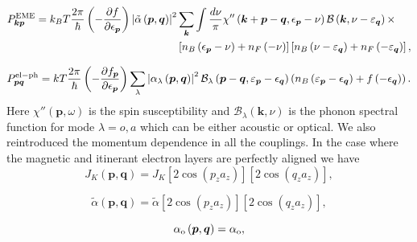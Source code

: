 \documentclass[aps,prl,twocolumn,superscriptaddress,amsmath,nofootinbib,10pt,floatfix]{revtex4-2}
\begin{document}
\begin{widetext}
\begin{align}
P_{\boldsymbol{k}\boldsymbol{p}}^{\rm{EME}} =k_BT\frac{2\pi}{\hbar}\left(-\frac{\partial f}{\partial\epsilon_{\boldsymbol{p}}}\right)\left|\tilde{\alpha}\left(\boldsymbol{p},\boldsymbol{q}\right)\right|^{2} & \sum_{\boldsymbol{k}}\int\frac{d\nu}{\pi}\chi''\left(\boldsymbol{k}+\boldsymbol{p}-\boldsymbol{q},\epsilon_{\boldsymbol{p}}-\nu\right)\mathcal{B}\left(\boldsymbol{k},\nu-\varepsilon_{\boldsymbol{q}}\right) \times \nonumber \\ &\left[n_{B}\left(\epsilon_{\boldsymbol{p}}-\nu\right)+n_{F}\left(-\nu\right)\right]\left[n_{B}\left(\nu-\varepsilon_{\boldsymbol{q}}\right)+n_{F}\left(-\varepsilon_{\boldsymbol{q}}\right)\right],
\end{align}

\begin{equation}
P_{\boldsymbol{p}\boldsymbol{q}}^{\rm{el-ph}}=kT\frac{2\pi}{\hbar}\left(-\frac{\partial f_{\boldsymbol{p}}}{\partial\epsilon_{\boldsymbol{p}}}\right)\sum_{\lambda}\left|\alpha_{\lambda}\left(\boldsymbol{p},\boldsymbol{q}\right)\right|^{2}\mathcal{B}_{\lambda}\left(\boldsymbol{p}-\boldsymbol{q},\varepsilon_{\boldsymbol{p}}-\epsilon_{\boldsymbol{q}}\right)\left(n_{B}\left(\varepsilon_{\boldsymbol{p}}-\epsilon_{\boldsymbol{q}}\right)+f\left(-\epsilon_{\boldsymbol{q}}\right)\right).
\end{equation}
Here $\chi''\left(\boldsymbol{p},\omega\right)$ is the spin susceptibility
and $\mathcal{B}_{\lambda}\left(\boldsymbol{k},\nu\right)$ is the
phonon spectral function for mode $\lambda=o,a$ which can be either
acoustic or optical. We also reintroduced the momentum dependence
in all the couplings. In the case where the magnetic and itinerant
electron layers are perfectly aligned we have 
\begin{equation}
J_{K}\left(\boldsymbol{p},\boldsymbol{q}\right)=J_{K}\left[2\cos\left(p_{z}a_{z}\right)\right]\left[2\cos\left(q_{z}a_{z}\right)\right],
\end{equation}

\begin{equation}
\tilde{\alpha}\left(\boldsymbol{p},\boldsymbol{q}\right)=\tilde{\alpha}\left[2\cos\left(p_{z}a_{z}\right)\right]\left[2\cos\left(q_{z}a_{z}\right)\right],
\end{equation}

\begin{equation}
\alpha_{\rm{o}}\left(\boldsymbol{p},\boldsymbol{q}\right)=\alpha_{\rm{o}},
\end{equation}


\end{widetext}
\end{document}

